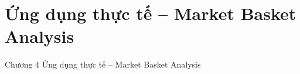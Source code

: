 \section{Ứng dụng thực tế -- Market Basket Analysis}
\begin{frame}{Chương 4}
    \Large Ứng dụng thực tế -- Market Basket Analysis
\end{frame}
